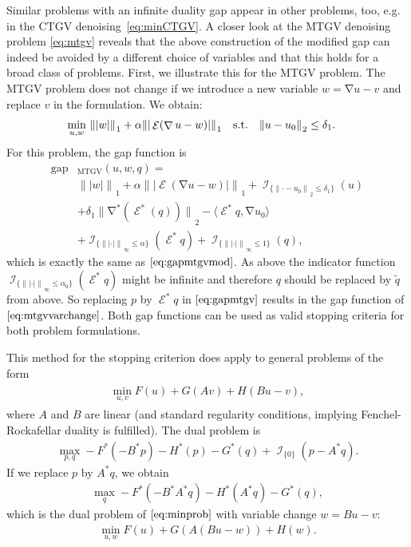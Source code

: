 \documentclass[twocolumn,envcountsame]{svjour3}
\newcommand{\norm}[2][]{{\|{#2}\|_{}}_{#1}}
\newcommand{\abs}[1]{|#1|}
\newcommand{\subjectto}{\text{\quad s.t.\quad }}
\DeclareMathOperator{\ind}{\mathcal{I}}
\DeclareMathOperator{\gap}{gap}
\DeclareMathOperator{\grad}{\nabla}
\DeclareMathOperator{\symgrad}{\mathcal{E}}
\begin{document}
Similar problems with an infinite duality gap appear in other problems, too, e.g. in the CTGV denoising~\eqref{eq:minCTGV}.
A closer look at the  MTGV denoising problem \eqref{eq:mtgv} reveals that the above construction of the modified gap can indeed be avoided by a different choice of variables and that this holds for a broad class of problems.
First, we illustrate this for the MTGV problem. 
The MTGV problem does not change if we introduce a new variable $w=\grad u -v$ and replace $v$ in the
formulation. We obtain:
\begin{equation}\label{eq:mtgvvarchange}
\begin{split}
	\min_{u,w}\, \norm[1]{\abs{w}} + \alpha\norm[1]{\abs{\symgrad(\grad u - w)}}
	\subjectto 
	&\norm[2]{u-u_0}\leq \delta_1.
\end{split}
\end{equation}
For this problem, the gap function is
\begin{equation}
  \label{eq:gapmtgvvarchange}
  \begin{split}
    \gap&_{\operatorname{MTGV}}(u,w,q)=\\
    &\norm[1]{\abs{w}} + 
    \alpha\norm[1]{\abs{\symgrad(\grad u -w)}}
    +\ind_{\{\norm[2]{\cdot-u_0}\leq \delta_1\}}(u)\\
    &+\delta_1\norm[2]{\grad^* (\symgrad^*(q))} - \langle \symgrad^*q, \grad u_0\rangle \\ 
    &+
    \ind_{\{\norm[\infty]{\abs{\cdot}}\leq\alpha\}}(\symgrad^*q) +
    \ind_{\{\norm[\infty]{\abs{\cdot}}\leq 1\}}(q),
  \end{split}
\end{equation}
which is exactly the same as $\eqref{eq:gapmtgvmod}$. As above the indicator function 
$\ind_{\{\norm[\infty]{\abs{\cdot}}\leq\alpha_0\}}(\symgrad^*q)$ might be
infinite and therefore $q$ should be replaced by $\tilde q$ from above. 
So replacing $p$ by $\symgrad^*q$ in $\eqref{eq:gapmtgv}$ results in the gap function of
$\eqref{eq:mtgvvarchange}$. Both gap functions can be used as valid stopping criteria for
both problem formulations.

This method for the stopping criterion does apply to general problems of the form
\begin{align}
  \label{eq:minprob}
  \begin{split}
    \min_{u,v} F(u) + G(Av) + H(Bu-v),
  \end{split}
\end{align}
where $A$ and $B$ are linear (and standard regularity conditions, implying Fenchel-Rockafellar duality is fulfilled). 
The dual problem is
\begin{align*}
  \max_{p,q} -F^*(-B^*p) - H^*(p) - G^*(q) + \ind_{\{0\}}(p - A^*q).
\end{align*}
  If we replace $p$ by $A^*q$, we obtain
  \begin{align*}
    \max_q -F^*(-B^*A^*q) - H^*(A^*q) - G^*(q),
  \end{align*}
  which is the dual problem of $\eqref{eq:minprob}$ with variable change $w=Bu-v$:
  \begin{align*}
    \min_{u,w}	F(u) + G(A(Bu-w)) + H(w).
  \end{align*}
  
\end{document}
